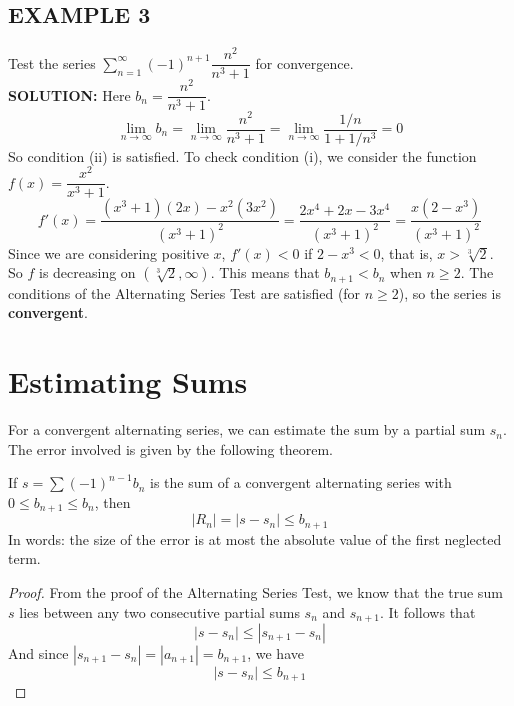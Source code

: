 \documentclass{article}
\theoremstyle{mystyle}
\begin{document}
\subsection*{EXAMPLE 3}
Test the series \( \sum_{n=1}^{\infty} (-1)^{n+1} \dfrac{n^2}{n^3+1} \) for convergence.\\
\textbf{SOLUTION:}
Here \(b_n = \dfrac{n^2}{n^3+1}\).
\[ \lim_{n\to\infty} b_n = \lim_{n\to\infty} \dfrac{n^2}{n^3+1} = \lim_{n\to\infty} \dfrac{1/n}{1+1/n^3} = 0 \]
So condition (ii) is satisfied. To check condition (i), we consider the function \(f(x) = \dfrac{x^2}{x^3+1}\).
\[ f'(x) = \dfrac{(x^3+1)(2x) - x^2(3x^2)}{(x^3+1)^2} = \dfrac{2x^4+2x-3x^4}{(x^3+1)^2} = \dfrac{x(2-x^3)}{(x^3+1)^2} \]
Since we are considering positive \(x\), \(f'(x) < 0\) if \(2-x^3 < 0\), that is, \(x > \sqrt[3]{2}\).
So \(f\) is decreasing on \((\sqrt[3]{2}, \infty)\). This means that \(b_{n+1} < b_n\) when \(n \ge 2\). The conditions of the Alternating Series Test are satisfied (for \(n \ge 2\)), so the series is \textbf{convergent}.

\section*{Estimating Sums}
For a convergent alternating series, we can estimate the sum by a partial sum \(s_n\). The error involved is given by the following theorem.

\begin{tcolorbox}[
    colback=white,
    colframe=orange!80!white,
    title=Alternating Series Estimation Theorem,
    boxrule=0.5mm,
    arc=3mm
    ]
    If \(s = \sum (-1)^{n-1} b_n\) is the sum of a convergent alternating series with \(0 \le b_{n+1} \le b_n\), then
    \[ |R_n| = |s - s_n| \le b_{n+1} \]
    In words: the size of the error is at most the absolute value of the first neglected term.
\end{tcolorbox}

\begin{proof}
[Proof]
From the proof of the Alternating Series Test, we know that the true sum \(s\) lies between any two consecutive partial sums \(s_n\) and \(s_{n+1}\). It follows that
\[ |s - s_n| \le |s_{n+1} - s_n| \]
And since \( |s_{n+1} - s_n| = |a_{n+1}| = b_{n+1} \), we have
\[ |s - s_n| \le b_{n+1} \]
\end{proof}
\end{document}
